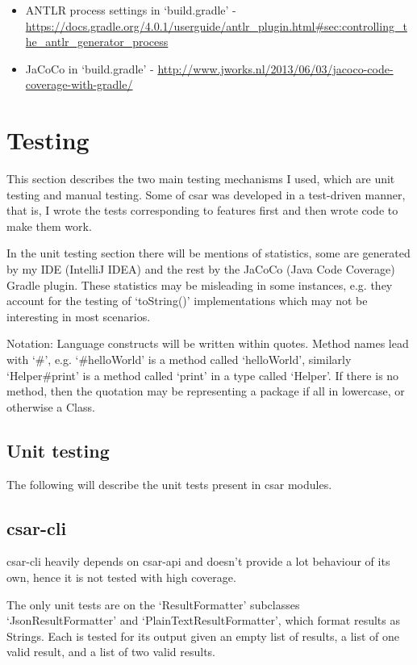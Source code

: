 \documentclass[12pt, letterpaper]{article}
\begin{document}
\begin{itemize}
  \item ANTLR process settings in `build.gradle' - \url{https://docs.gradle.org/4.0.1/userguide/antlr\_plugin.html\#sec:controlling\_the\_antlr\_generator\_process}
  \item JaCoCo in `build.gradle' - \url{http://www.jworks.nl/2013/06/03/jacoco-code-coverage-with-gradle/}
\end{itemize}

\section{Testing}
This section describes the two main testing mechanisms I used, which are unit testing and manual testing.
Some of csar was developed in a test-driven manner, that is, I wrote the tests corresponding to features first and then wrote code to make them work.

In the unit testing section there will be mentions of statistics, some are generated by my IDE (IntelliJ IDEA) and the rest by the JaCoCo (Java Code Coverage) Gradle plugin.
These statistics may be misleading in some instances, e.g. they account for the testing of `toString()' implementations which may not be interesting in most scenarios.

Notation: Language constructs will be written within quotes.
Method names lead with `\#', e.g. `\#helloWorld' is a method called `helloWorld', similarly `Helper\#print' is a method called `print' in a type called `Helper'.
If there is no method, then the quotation may be representing a package if all in lowercase, or otherwise a Class.

\subsection{Unit testing}
The following will describe the unit tests present in csar modules.

\subsection{csar-cli}
csar-cli heavily depends on csar-api and doesn't provide a lot behaviour of its own, hence it is not tested with high coverage.

The only unit tests are on the `ResultFormatter' subclasses `JsonResultFormatter' and `PlainTextResultFormatter', which format results as Strings.
Each is tested for its output given an empty list of results, a list of one valid result, and a list of two valid results.
\end{document}
